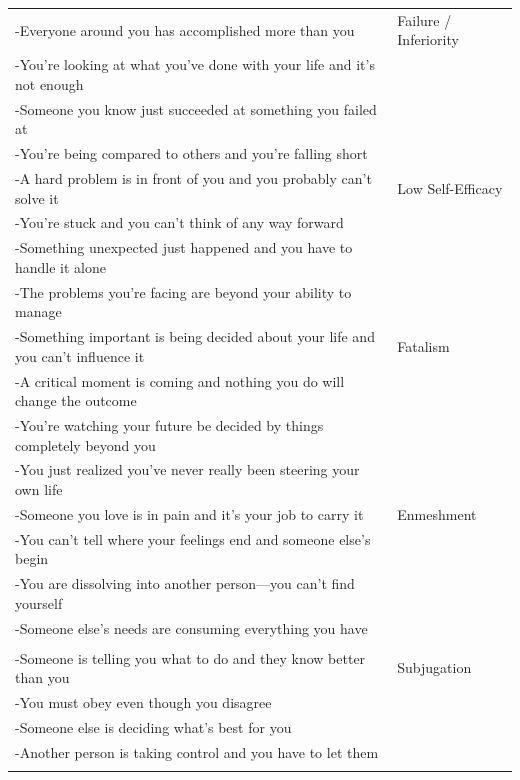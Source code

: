 \documentclass[11pt,oneside]{book}
\begin{document}
\begin{longtable}{>{\raggedright\arraybackslash}p{} >{\raggedright\arraybackslash}p{}}
-Everyone around you has accomplished more than you & Failure / Inferiority \\
-You're looking at what you've done with your life and it's not enough &  \\
-Someone you know just succeeded at something you failed at &  \\
-You're being compared to others and you're falling short &  \\
\addlinespace

-A hard problem is in front of you and you probably can't solve it & Low Self-Efficacy \\
-You're stuck and you can't think of any way forward &  \\
-Something unexpected just happened and you have to handle it alone &  \\
-The problems you're facing are beyond your ability to manage &  \\
\addlinespace

-Something important is being decided about your life and you can't influence it & Fatalism \\
-A critical moment is coming and nothing you do will change the outcome &  \\
-You're watching your future be decided by things completely beyond you &  \\
-You just realized you've never really been steering your own life &  \\
\addlinespace

-Someone you love is in pain and it's your job to carry it & Enmeshment \\
-You can't tell where your feelings end and someone else's begin &  \\
-You are dissolving into another person---you can't find yourself &  \\
-Someone else's needs are consuming everything you have &  \\

\midrule
\multicolumn{2}{l}{\textbf{Freedom to Express Needs, Opinions \& Emotions}} \\
\midrule

-Someone is telling you what to do and they know better than you & Subjugation \\
-You must obey even though you disagree &  \\
-Someone else is deciding what's best for you &  \\
-Another person is taking control and you have to let them &  \\
\addlinespace


\end{longtable}
\end{document}
